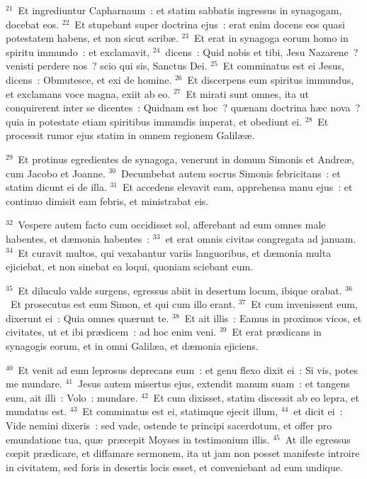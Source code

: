 ${}^{21}$~Et ingrediuntur Capharnaum~: et statim sabbatis ingressus in synagogam, docebat eos.
${}^{22}$~Et stupebant super doctrina ejus~: erat enim docens eos quasi potestatem habens, et non sicut scrib\ae .
${}^{23}$~Et erat in synagoga eorum homo in spiritu immundo~: et exclamavit,
${}^{24}$~dicens~: Quid nobis et tibi, Jesu Nazarene~? venisti perdere nos~? scio qui sis, Sanctus Dei.
${}^{25}$~Et comminatus est ei Jesus, dicens~: Obmutesce, et exi de homine.
${}^{26}$~Et discerpens eum spiritus immundus, et exclamans voce magna, exiit ab eo.
${}^{27}$~Et mirati sunt omnes, ita ut conquirerent inter se dicentes~: Quidnam est hoc~? qu\ae nam doctrina h\ae c nova~? quia in potestate etiam spiritibus immundis imperat, et obediunt ei.
${}^{28}$~Et processit rumor ejus statim in omnem regionem Galil\ae \ae .


${}^{29}$~Et protinus egredientes de synagoga, venerunt in domum Simonis et Andre\ae , cum Jacobo et Joanne.
${}^{30}$~Decumbebat autem socrus Simonis febricitans~: et statim dicunt ei de illa.
${}^{31}$~Et accedens elevavit eam, apprehensa manu ejus~: et continuo dimisit eam febris, et ministrabat eis.


${}^{32}$~Vespere autem facto cum occidisset sol, afferebant ad eum omnes male habentes, et d\ae monia habentes~:
${}^{33}$~et erat omnis civitas congregata ad januam.
${}^{34}$~Et curavit multos, qui vexabantur variis languoribus, et d\ae monia multa ejiciebat, et non sinebat ea loqui, quoniam sciebant eum.


${}^{35}$~Et diluculo valde surgens, egressus abiit in desertum locum, ibique orabat.
${}^{36}$~Et prosecutus est eum Simon, et qui cum illo erant.
${}^{37}$~Et cum invenissent eum, dixerunt ei~: Quia omnes qu\ae runt te.
${}^{38}$~Et ait illis~: Eamus in proximos vicos, et civitates, ut et ibi pr\ae dicem~: ad hoc enim veni.
${}^{39}$~Et erat pr\ae dicans in synagogis eorum, et in omni Galil\ae a, et d\ae monia ejiciens.


${}^{40}$~Et venit ad eum leprosus deprecans eum~: et genu flexo dixit ei~: Si vis, potes me mundare.
${}^{41}$~Jesus autem misertus ejus, extendit manum suam~: et tangens eum, ait illi~: Volo~: mundare.
${}^{42}$~Et cum dixisset, statim discessit ab eo lepra, et mundatus est.
${}^{43}$~Et comminatus est ei, statimque ejecit illum,
${}^{44}$~et dicit ei~: Vide nemini dixeris~: sed vade, ostende te principi sacerdotum, et offer pro emundatione tua, qu\ae\ pr\ae cepit Moyses in testimonium illis.
${}^{45}$~At ille egressus cœpit pr\ae dicare, et diffamare sermonem, ita ut jam non posset manifeste introire in civitatem, sed foris in desertis locis esset, et conveniebant ad eum undique.


